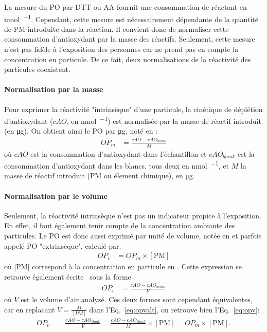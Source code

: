 La mesure du PO par DTT ou AA fournit une consommation de réactant en \si{\nmol\per\min}.
Cependant, cette mesure est nécessairement dépendante de la quantité de PM introduite dans
la réaction.
Il convient donc de normaliser cette consommation d'antioxydant par la masse des réactifs.
Seulement, cette mesure n'est pas fidèle à l'exposition des personnes car ne prend pas en
compte la concentration en particule. De ce fait, deux normalisations de la réactivité des
particules coexistent.

\paragraph{Normalisation par la masse}%
\label{par:normalisation_par_la_masse}
Pour exprimer la réactivité "intrinsèque" d'une particule, la cinétique de déplétion
d'antioxydant ($cAO$, en \si{\nmol\per\min}) est normalisée par la masse de réactif
introduit (en \si{\ug}). On obtient ainsi le PO par \si{\ug}, noté \OPm{} en
\si{\opm}:
\begin{align}
    \label{eq:opm}
    OP_m &= \frac{cAO - cAO_{blank}}{M}
\end{align}
où $cAO$ est la consommation d'antioxydant dans l'échantillon et $cAO_{blank}$
est la consommation d'antioxydant dans les blancs, tous deux en \si{\nmol\per\min}, et $M$
la masse de réactif introduit (PM ou élement chimique), en \si{\ug}.

\paragraph{Normalisation par le volume}%
\label{par:normalisation_par_le_volume}

Seulement, la réactivité intrinsèque n'est pas un indicateur propice à l'exposition. En
effet, il faut également tenir compte de la concentration ambiante des particules. Le PO
est donc aussi exprimé par unité de volume, notée \OPv{} en \si{\opv} et parfois appelé PO
"extrinsèque", calculé par:
\begin{align}
    \label{eq:opv}
    OP_v &= OP_m \times [\text{PM}]
\end{align}
où [PM] correspond à la concentration en particule en \si{\ugm}. Cette expression se
retrouve également écrite~\autocite{fangSemiautomated2015} sous la forme
\begin{align}
    \label{eq:opvalt}
    OP_v &= \frac{cAO - cAO_{blank}}{V}
\end{align}
où $V$ est le volume d'air analysé. Ces deux formes sont cependant équivalentes, car en
replacant $V = \frac{M}{[PM]}$ dans l'Eq.~\ref{eq:opvalt}, on retrouve bien
l'Eq.~\ref{eq:opv}:
\begin{align}
    \label{eq:opvopvalt}
    OP_v &= \frac{cAO -cAO_{blank}}{V} = \frac{cAO -cAO_{blank}}{M}\times [\text{PM}] = OP_m \times [\text{PM}].
\end{align}


